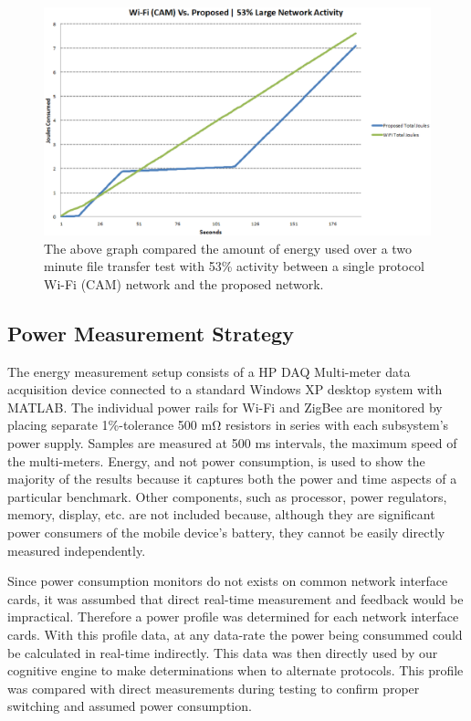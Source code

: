 \documentclass[conference]{IEEEtran}
\begin{document}
\begin{figure}
\begin{center}
\includegraphics[scale=0.30]{energy_con.eps}
\caption{The above graph compared the amount of energy used over a two minute file transfer test with 53\% activity between a single protocol Wi-Fi (CAM) network and the proposed network.}
\end{center}
\end{figure}


\subsection{Power Measurement Strategy}
The energy measurement setup consists of a HP DAQ Multi-meter data acquisition device connected to a standard Windows XP desktop system with MATLAB. The individual power rails for Wi-Fi and ZigBee are monitored by placing separate 1\%-tolerance 500 mΩ resistors in series with each subsystem’s power supply. Samples are measured at 500 ms intervals, the maximum speed of the multi-meters.  Energy, and not power consumption, is used to show the majority of the results because it captures both the power and time aspects of a particular benchmark. Other components, such as processor, power regulators, memory, display, etc. are not included because, although they are significant power consumers of the mobile device’s battery, they cannot be easily directly measured independently.

Since power consumption monitors do not exists on common network interface cards, it was assumbed that direct real-time measurement and feedback would be impractical.  Therefore a power profile was determined for each network interface cards.  With this profile data, at any data-rate the power being consummed could be calculated in real-time indirectly.  This data was then directly used by our cognitive engine to make determinations when to alternate protocols.  This profile was compared with direct measurements during testing to confirm proper switching and assumed power consumption.
\end{document}
